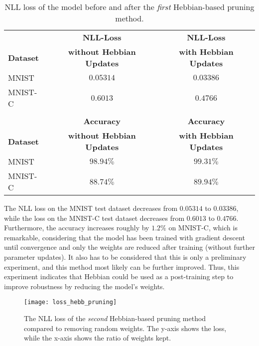 \begin{table}[h] 
    \centering
	 \begin{tabular}{l c c} 
    	 & \textbf{NLL-Loss} & \textbf{NLL-Loss} \\
        \textbf{Dataset} & \textbf{without Hebbian Updates} & \textbf{with Hebbian Updates}\\
        \hline
        MNIST & \(0.05314\) & \(0.03386\) \\
        MNIST-C & \(0.6013\) & \(0.4766\) \\
         & & \\
    	 &\textbf{Accuracy} & \textbf{Accuracy} \\
        \textbf{Dataset} & \textbf{without Hebbian Updates }& \textbf{with Hebbian Updates}\\
        \hline
        MNIST & \(98.94\%\) & \(99.31\%\) \\
        MNIST-C & \(88.74\%\) & \(89.94\%\) \\
    \end{tabular}
    \caption[NLL loss of the Hebbian pruning network]{NLL loss of the model before and after the \emph{first} Hebbian-based pruning method.}
\end{table}

The NLL loss on the MNIST test dataset decreases from \(0.05314\) to \(0.03386\), while the loss on the MNIST-C test dataset decreases from \(0.6013\) to \(0.4766\).
Furthermore, the accuracy increases roughly by $1.2\%$ on MNIST-C, which is remarkable, considering that the model has been trained with gradient descent until convergence and only the weights are reduced after training (without further parameter updates).
It also has to be considered that this is only a preliminary experiment, and this method most likely can be further improved.
Thus, this experiment indicates that Hebbian could be used as a post-training step to improve robustness by reducing the model's weights.

\begin{figure}[h]
    \centering
    \texttt{[image: loss\_hebb\_pruning]}
    \caption[NLL loss of the Hebbian pruning network]{The NLL loss of the \emph{second} Hebbian-based pruning method compared to removing random weights. The y-axis shows the loss, while the x-axis shows the ratio of weights kept. }
\end{figure}

